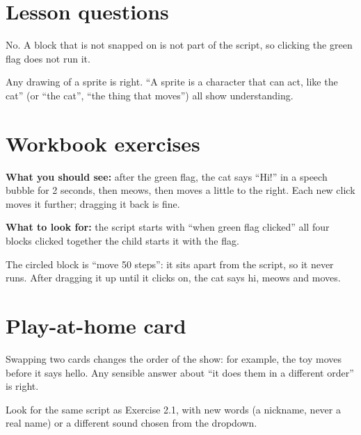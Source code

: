 
\section{Lesson questions}
\begin{answer}
No. A block that is not snapped on is not part of the script, so clicking the green flag does not run it.
\end{answer}

\begin{answer}[Reflection]
Any drawing of a sprite is right. \enquote{A sprite is a character that can act, like the cat} (or \enquote{the cat}, \enquote{the thing that moves}) all show understanding.
\end{answer}

\section{Workbook exercises}
\begin{answer}
\textbf{What you should see:} after the green flag, the cat says \enquote{Hi!} in a speech bubble for 2 seconds, then meows, then moves a little to the right. Each new click moves it further; dragging it back is fine.

\textbf{What to look for:} \tickbox{} the script starts with \enquote{when green flag clicked} \quad \tickbox{} all four blocks clicked together \quad \tickbox{} the child starts it with the flag.
\end{answer}

\begin{answer}
The circled block is \enquote{move 50 steps}: it sits apart from the script, so it never runs. After dragging it up until it clicks on, the cat says hi, meows and moves.
\end{answer}

\section{Play-at-home card}
\begin{answer}
Swapping two cards changes the order of the show: for example, the toy moves before it says hello. Any sensible answer about \enquote{it does them in a different order} is right.
\end{answer}

\begin{answer}
Look for the same script as Exercise 2.1, with new words (a nickname, never a real name) or a different sound chosen from the dropdown.
\end{answer}
